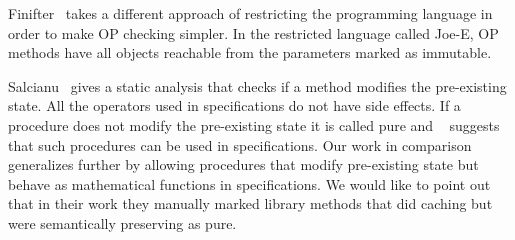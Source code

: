 \documentclass{llncs}
\begin{document}
Finifter~\cite{cok2008extensions} takes a different approach of restricting
the programming language in order to make OP checking simpler. In the
restricted language called Joe-E, OP methods have all objects reachable
from the parameters marked as immutable.

Salcianu~\cite{sualcianu2005purity} gives a static analysis
that checks if a method modifies the pre-existing state. All the
operators used in specifications do not have side effects. If a
procedure does not modify the pre-existing state it is called pure and
~\cite{barnett200499} suggests that such procedures can be used in
specifications. Our work in comparison generalizes further by
allowing procedures that modify pre-existing state but behave as
mathematical functions in specifications. We would like to point out
that in their work they manually marked library methods that did
caching but were semantically preserving as pure.

\nocite{barnett2004spec}
\nocite{lahiri2013differential}
\nocite{de2008z3}
\nocite{alpern1988detecting}
\nocite{sondergaard1990referential}
\nocite{flanagan2001avoiding}
\nocite{sualcianu2005purity}
\nocite{cytron1991efficiently}
\nocite{leino2008boogie}
\end{document}
